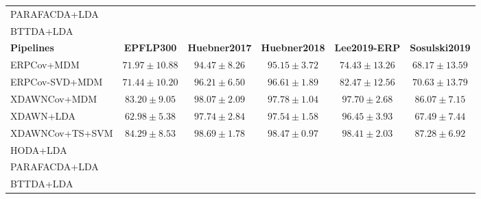 \begin{tabularx}{\textwidth}{@{}Xccccc@{}}
PARAFACDA+LDA             & & & & &  \\
BTTDA+LDA                 & & & & &  \\
\toprule
\textbf{Pipelines} &  \textbf{EPFLP300} & \textbf{Huebner2017} &
\textbf{Huebner2018} & \textbf{Lee2019-ERP} & \textbf{Sosulski2019} \\
\midrule
ERPCov+MDM            & $71.97\pm10.88$ & $94.47\pm8.26$ & $95.15\pm3.72$ &
$74.43\pm13.26$ & $68.17\pm13.59$ \\
ERPCov-SVD+MDM  & $71.44\pm10.20$ & $96.21\pm6.50$ & $96.61\pm1.89$ &
$82.47\pm12.56$ & $70.63\pm13.79$ \\
XDAWNCov+MDM          & $83.20\pm9.05$ & $98.07\pm2.09$ & $97.78\pm1.04$ &
$97.70\pm2.68$ & $86.07\pm7.15$ \\
XDAWN+LDA             & $62.98\pm5.38$ & $97.74\pm2.84$ & $97.54\pm1.58$ &
$96.45\pm3.93$ & $67.49\pm7.44$ \\
XDAWNCov+TS+SVM       & $84.29\pm8.53$ & $98.69\pm1.78$ & $98.47\pm0.97$ &
$98.41\pm2.03$ & $87.28\pm6.92$ \\ \midrule
HODA+LDA                  & & & & &  \\
PARAFACDA+LDA             & & & & &  \\
BTTDA+LDA                 & & & & &  \\
\bottomrule
\end{tabularx}
